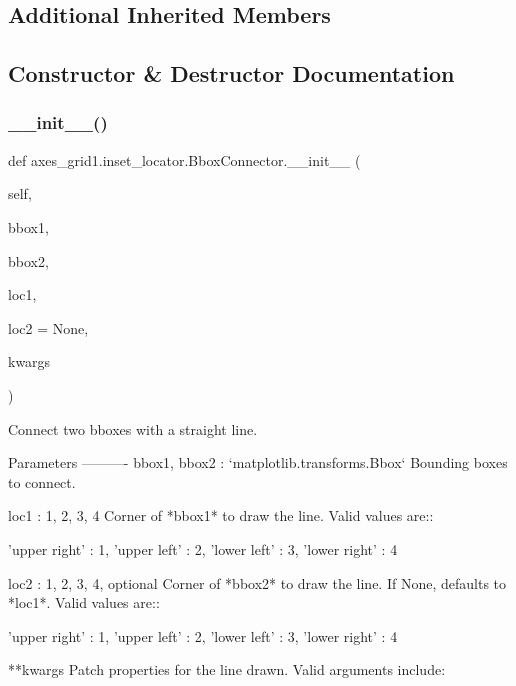 \subsection*{Additional Inherited Members}


\subsection{Constructor \& Destructor Documentation}
\mbox{\label{classaxes__grid1_1_1inset__locator_1_1BboxConnector_a56f662a15b658a20f6f7f57f92e5cd61}} 
\subsubsection{\texorpdfstring{\+\_\+\+\_\+init\+\_\+\+\_\+()}{\_\_init\_\_()}}
{\footnotesize\ttfamily def axes\+\_\+grid1.\+inset\+\_\+locator.\+Bbox\+Connector.\+\_\+\+\_\+init\+\_\+\+\_\+ (\begin{DoxyParamCaption}\item[{}]{self,  }\item[{}]{bbox1,  }\item[{}]{bbox2,  }\item[{}]{loc1,  }\item[{}]{loc2 = {\ttfamily None},  }\item[{}]{kwargs }\end{DoxyParamCaption})}

\begin{DoxyVerb}Connect two bboxes with a straight line.

Parameters
----------
bbox1, bbox2 : `matplotlib.transforms.Bbox`
    Bounding boxes to connect.

loc1 : {1, 2, 3, 4}
    Corner of *bbox1* to draw the line. Valid values are::

'upper right'  : 1,
'upper left'   : 2,
'lower left'   : 3,
'lower right'  : 4

loc2 : {1, 2, 3, 4}, optional
    Corner of *bbox2* to draw the line. If None, defaults to *loc1*.
    Valid values are::

'upper right'  : 1,
'upper left'   : 2,
'lower left'   : 3,
'lower right'  : 4

**kwargs
    Patch properties for the line drawn. Valid arguments include:

\end{DoxyVerb}
 

